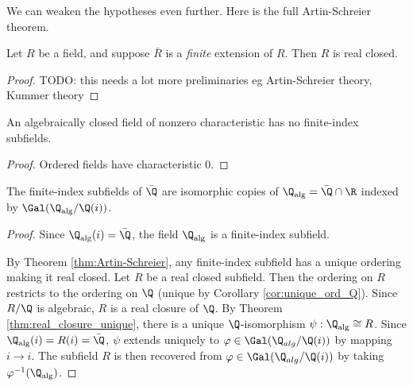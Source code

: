 We can weaken the hypotheses even further. Here is the full Artin-Schreier theorem.

\begin{theorem}
  \label{thm:Artin-Schreier}
  \leanok
  Let $R$ be a field, and suppose $\bar{R}$ is a \textit{finite} extension of $R$. Then $R$ is real closed.
\end{theorem}
\begin{proof}
  TODO: this needs a lot more preliminaries eg Artin-Schreier theory, Kummer theory
\end{proof}

\begin{corollary}
  \label{cor:ACF_char_p_no_fin_ind}
  An algebraically closed field of nonzero characteristic has no finite-index subfields.
\end{corollary}
\begin{proof}
  Ordered fields have characteristic 0.
\end{proof}

\begin{theorem}
  \label{thm:Q_alg_unique_fin_ind}
  The finite-index subfields of $\bar{\Q}$ are isomorphic copies of $\Q_{\text{alg}}=\bar{\Q}\cap\R$ indexed by $\Gal(\Q_{\text{alg}}/\Q(i))$.
\end{theorem}
\begin{proof}
  Since $\Q_{\text{alg}}(i)=\bar{\Q}$, the field $\Q_{\text{alg}}$ is a finite-index subfield.

  By Theorem \ref{thm:Artin-Schreier}, any finite-index subfield has a unique ordering making it real closed. Let $R$ be a real closed subfield. Then the ordering on $R$ restricts to the ordering on $\Q$ (unique by Corollary \ref{cor:unique_ord_Q}). Since $R/\Q$ is algebraic, $R$ is a real closure of $\Q$. By Theorem \ref{thm:real_closure_unique}, there is a unique $\Q$-isomorphism $\psi:\Q_{\text{alg}}\cong R$. Since $\Q_{\text{alg}}(i)=R(i)=\bar{\Q}$, $\psi$ extends uniquely to $\varphi\in\Gal(\Q_{alg}/\Q(i))$ by mapping $i\to i$. The subfield $R$ is then recovered from $\varphi\in\Gal(\Q_{alg}/\Q(i))$ by taking $\varphi^{-1}(\Q_{\text{alg}})$.
\end{proof}



